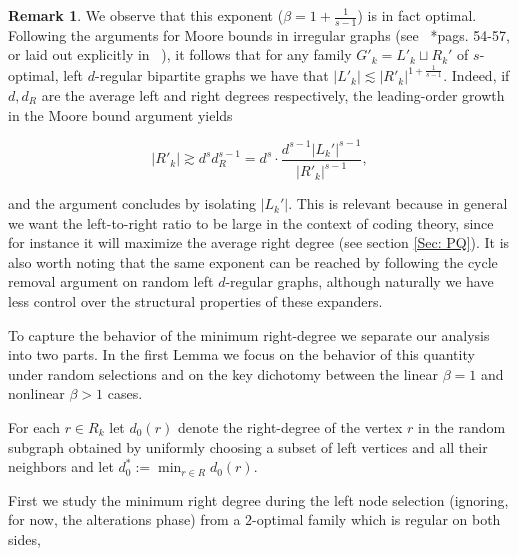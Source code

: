 \documentclass[12pt]{amsart}
\theoremstyle{definition}
\newtheorem{remark}[lemma]{Remark}
\newcommand{\1}{\ensuremath{\mathbb{1}}}
\begin{document}
\begin{remark} 
We observe that this exponent ($\beta = 1+\frac{1}{s-1}$) is in fact optimal. Following the arguments for Moore bounds in irregular graphs (see ~\cite{AHL}*{pags. 54-57},  or laid out explicitly in  ~\cite{Hoory}), it follows that for any family $G'_k = L'_k \sqcup R_k'$ of $s$-optimal, left $d$-regular bipartite graphs we have that $|L'_k| \lesssim |R'_k|^{1+\frac{1}{s-1}}$. Indeed, if $d,d_R$ are the average left and right degrees respectively, the leading-order growth in the Moore bound argument yields

\[|R'_k| \gtrsim d^{s}d_R^{s-1} = d^{s}\cdot \dfrac{d^{s-1}|L_k'|^{s-1}}{|R'_k|^{s-1}},\]

and the argument concludes by isolating $|L_k'|$. This is relevant because in general we want the left-to-right ratio to be large in the context of coding theory, since for instance it will maximize the average right degree (see section \ref{Sec: PQ}). It is also worth noting that the same exponent can be reached by following the cycle removal argument on random left $d$-regular graphs, although naturally we have less control over the structural properties of these expanders.
\end{remark}

To capture the behavior of the minimum right-degree we separate our analysis into two parts. In the first Lemma we focus on the behavior of this quantity under random selections and on the key dichotomy between the linear $\beta=1$ and nonlinear $\beta>1$ cases.

For each $r\in R_k$ let $d_0(r)$ denote the right-degree of the vertex $r$ in the random subgraph obtained by uniformly choosing a subset of left vertices and all their neighbors and let $d_0^*:=\min_{r\in R} d_0(r)$. 

First we study the minimum right degree during the left node selection (ignoring, for now, the alterations phase) from a $2$-optimal family which is regular on both sides,
\end{document}
